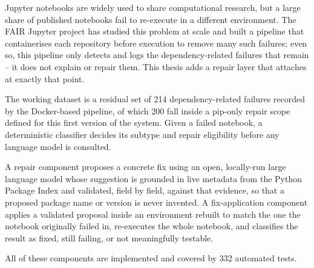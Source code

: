 Jupyter notebooks are widely used to share computational research, but a
large share of published notebooks fail to re-execute in a different
environment. The FAIR Jupyter project has studied this problem at scale and
built a pipeline that containerises each repository before execution to
remove many such failures; even so, this pipeline only detects and logs the
dependency-related failures that remain -- it does not explain or repair
them. This thesis adds a repair layer that attaches at exactly that point.

The working dataset is a residual set of 214 dependency-related failures
recorded by the Docker-based pipeline, of which 200 fall inside a pip-only
repair scope defined for this first version of the system. Given a failed
notebook, a deterministic classifier decides its subtype and repair
eligibility before any language model is consulted.


A repair component proposes a concrete
fix using an open,
locally-run large language model whose suggestion is grounded in live
metadata from the Python Package Index and validated, field by field,
against that evidence, so that a proposed package name or version is never
invented. A fix-application component applies a validated proposal inside
an environment rebuilt to match the one the notebook originally failed in,
re-executes the whole notebook, and classifies the result as fixed, still
failing, or not meaningfully testable.

All of these components are implemented and covered by 332 automated tests.


